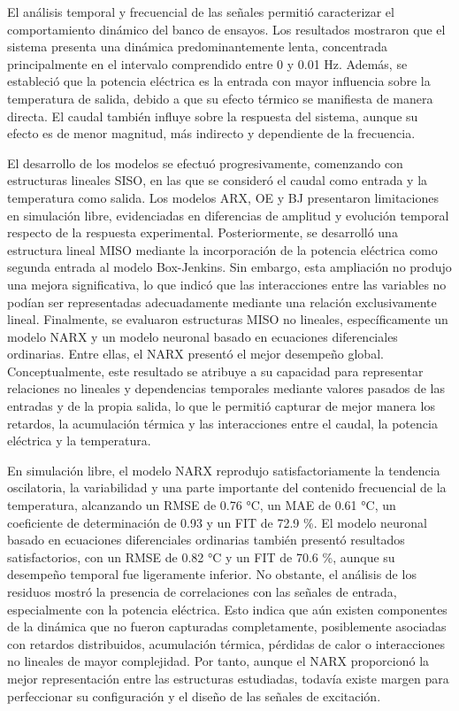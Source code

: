 \documentclass[11pt]{report}
\begin{document}
El análisis temporal y frecuencial de las señales permitió caracterizar el comportamiento dinámico del banco de ensayos. Los resultados mostraron que el sistema presenta una dinámica predominantemente lenta, concentrada principalmente en el intervalo comprendido entre 0 y 0.01 Hz. Además, se estableció que la potencia eléctrica es la entrada con mayor influencia sobre la temperatura de salida, debido a que su efecto térmico se manifiesta de manera directa. El caudal también influye sobre la respuesta del sistema, aunque su efecto es de menor magnitud, más indirecto y dependiente de la frecuencia.

El desarrollo de los modelos se efectuó progresivamente, comenzando con estructuras lineales SISO, en las que se consideró el caudal como entrada y la temperatura como salida. Los modelos ARX, OE y BJ presentaron limitaciones en simulación libre, evidenciadas en diferencias de amplitud y evolución temporal respecto de la respuesta experimental. Posteriormente, se desarrolló una estructura lineal MISO mediante la incorporación de la potencia eléctrica como segunda entrada al modelo Box-Jenkins. Sin embargo, esta ampliación no produjo una mejora significativa, lo que indicó que las interacciones entre las variables no podían ser representadas adecuadamente mediante una relación exclusivamente lineal. Finalmente, se evaluaron estructuras MISO no lineales, específicamente un modelo NARX y un modelo neuronal basado en ecuaciones diferenciales ordinarias. Entre ellas, el NARX presentó el mejor desempeño global. Conceptualmente, este resultado se atribuye a su capacidad para representar relaciones no lineales y dependencias temporales mediante valores pasados de las entradas y de la propia salida, lo que le permitió capturar de mejor manera los retardos, la acumulación térmica y las interacciones entre el caudal, la potencia eléctrica y la temperatura.

En simulación libre, el modelo NARX reprodujo satisfactoriamente la tendencia oscilatoria, la variabilidad y una parte importante del contenido frecuencial de la temperatura, alcanzando un RMSE de 0.76 °C, un MAE de 0.61 °C, un coeficiente de determinación de 0.93 y un FIT de 72.9 \%. El modelo neuronal basado en ecuaciones diferenciales ordinarias también presentó resultados satisfactorios, con un RMSE de 0.82 °C y un FIT de 70.6 \%, aunque su desempeño temporal fue ligeramente inferior. No obstante, el análisis de los residuos mostró la presencia de correlaciones con las señales de entrada, especialmente con la potencia eléctrica. Esto indica que aún existen componentes de la dinámica que no fueron capturadas completamente, posiblemente asociadas con retardos distribuidos, acumulación térmica, pérdidas de calor o interacciones no lineales de mayor complejidad. Por tanto, aunque el NARX proporcionó la mejor representación entre las estructuras estudiadas, todavía existe margen para perfeccionar su configuración y el diseño de las señales de excitación.
\end{document}
